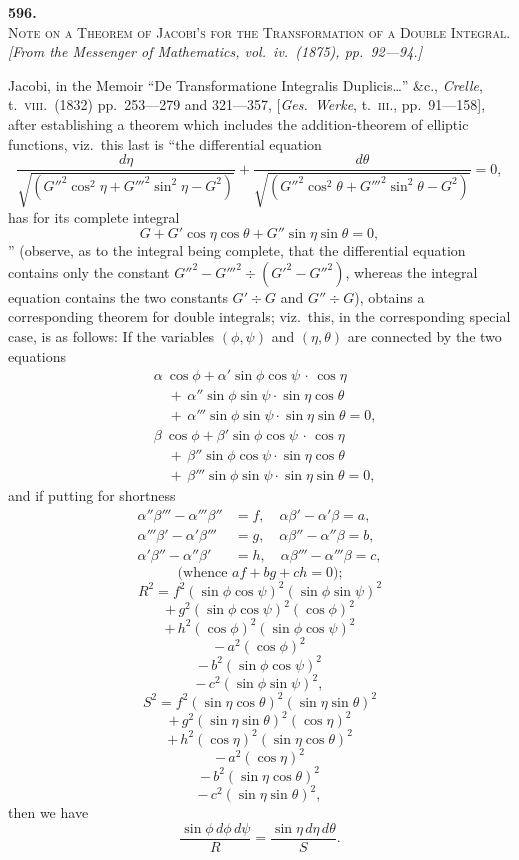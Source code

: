 \documentclass[11pt]{article}
\begin{document}
\begin{center}
{\large\textbf{596.}}\\[4pt]
{\scshape Note on a Theorem of Jacobi's for the Transformation of a Double Integral.}\\[4pt]
\textit{[From the \textit{Messenger of Mathematics}, vol.\ iv.\ (1875), pp.\ 92---94.]}
\end{center}

\medskip

Jacobi, in the Memoir ``De Transformatione Integralis Duplicis\ldots'' \&c., \textit{Crelle},
t.\ \textsc{viii}.\ (1832) pp.\ 253---279 and 321---357, [\textit{Ges.\ Werke}, t.\ \textsc{iii}.,
pp.\ 91---158], after establishing a theorem which includes the addition-theorem of
elliptic functions, viz.\ this last is ``the differential equation
\[
\frac{d\eta}{\sqrt{(G''^{2}\cos^{2}\eta+G'''^{2}\sin^{2}\eta-G^{2})}}+\frac{d\theta}{\sqrt{(G''^{2}\cos^{2}\theta+G'''^{2}\sin^{2}\theta-G^{2})}}=0,
\]
has for its complete integral
\[
G+G'\cos\eta\cos\theta+G''\sin\eta\sin\theta=0,
\]''
(observe, as to the integral being complete, that the differential equation contains
only the constant $G''^{2}-G'''^{2}\div(G'^{2}-G''^{2})$, whereas the integral equation
contains the two constants $G'\div G$ and $G''\div G$), obtains a corresponding theorem
for double integrals; viz.\ this, in the corresponding special case, is as follows: If
the variables $(\phi,\psi)$ and $(\eta,\theta)$ are connected by the two equations
\begin{align*}
&\alpha\ \cos\phi + \alpha'\sin\phi\cos\psi\,\cdot\,\cos\eta\\
&\quad +\,\alpha''\sin\phi\sin\psi\cdot\sin\eta\cos\theta\\
&\quad +\,\alpha'''\sin\phi\sin\psi\cdot\sin\eta\sin\theta=0,\\[4pt]
&\beta\ \cos\phi+\beta'\sin\phi\cos\psi\,\cdot\,\cos\eta\\
&\quad +\,\beta''\sin\phi\cos\psi\cdot\sin\eta\cos\theta\\
&\quad +\,\beta'''\sin\phi\sin\psi\cdot\sin\eta\sin\theta=0,
\end{align*}
and if putting for shortness
\begin{align*}
\alpha''\beta'''-\alpha'''\beta'' &= f,\quad \alpha\beta'-\alpha'\beta=a,\\
\alpha'''\beta'-\alpha'\beta''' &= g,\quad \alpha\beta''-\alpha''\beta=b,\\
\alpha'\beta''-\alpha''\beta' &= h,\quad \alpha\beta'''-\alpha'''\beta=c,
\end{align*}
\[
\text{(whence }af+bg+ch=0\text{);}
\]
\[
R^{2}=f^{2}(\sin\phi\cos\psi)^{2}(\sin\phi\sin\psi)^{2}
\]
\[
+\,g^{2}(\sin\phi\cos\psi)^{2}(\cos\phi)^{2}
\]
\[
+\,h^{2}(\cos\phi)^{2}(\sin\phi\cos\psi)^{2}
\]
\[
-\,a^{2}(\cos\phi)^{2}
\]
\[
-\,b^{2}(\sin\phi\cos\psi)^{2}
\]
\[
-\,c^{2}(\sin\phi\sin\psi)^{2},
\]
\[
S^{2}=f^{2}(\sin\eta\cos\theta)^{2}(\sin\eta\sin\theta)^{2}
\]
\[
+\,g^{2}(\sin\eta\sin\theta)^{2}(\cos\eta)^{2}
\]
\[
+\,h^{2}(\cos\eta)^{2}(\sin\eta\cos\theta)^{2}
\]
\[
-\,a^{2}(\cos\eta)^{2}
\]
\[
-\,b^{2}(\sin\eta\cos\theta)^{2}
\]
\[
-\,c^{2}(\sin\eta\sin\theta)^{2},
\]
then we have
\[
\frac{\sin\phi\,d\phi\,d\psi}{R}=\frac{\sin\eta\,d\eta\,d\theta}{S}.
\]
\end{document}
